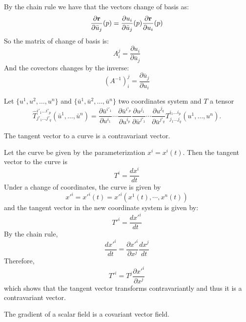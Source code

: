 By the chain rule we have that the vectors change of basis as:
\[\dfrac{\partial \mathbf{ r}}{\partial \bar{u}_j}(p)= \dfrac{\partial  u_i}{\partial  \bar{u}_j}(p)\dfrac{\partial \mathbf{ r}}{\partial  u_i}(p)\]
So the matrix of change of basis  is:
\[A_i^j=\dfrac{\partial  u_i}{\partial  \bar{u}_j}\]
And the covectors changes by the inverse:
\[\left(A^{-1}\right)_i^j=\dfrac{\partial  \bar{u}_j}{\partial  u_i}\]





\begin{theorem} 
Let $\{u^1, u^2, \dots, u^n\}$ and $\{\bar{u}^1, \bar{u}^2, \dots, \bar{u}^n\}$  two coordinates system and 
$T$ a tensor
 \[\hat{T}^{i'_1\dots i'_p}_{j'_1\dots j'_q}(\bar{u}^1,\ldots,\bar{u}^n) =
\dfrac{\partial \bar{u}^{i'_1}}{\partial u^{i_1}}
\cdots
\dfrac{\partial \bar{u}^{i'_p}}{\partial u^{i_p}}
\dfrac{\partial u^{j_{1}}}{\partial \bar{u}^{j'_{1}}}
\cdots
\dfrac{\partial u^{j_q}}{\partial \bar{u}^{j'_q}}
T^{i_1\dots i_p}_{j_{1}\dots j_q}(u^1,\ldots,u^n).\]
\end{theorem}



\begin{exa}[Contravariance] The tangent vector to a curve is a contravariant vector. 
 
\end{exa}
 
 \begin{solu}
 Let the curve be given by the parameterization $ x^i = x^i(t)$. Then the tangent vector to the curve is
\[ T^i = \frac{dx^i}{dt}\]
Under a change of coordinates, the curve is given by
\[ x'^i=x'^i (t) = x'^i(x^1(t),\cdots,x^n(t))\]
and the tangent vector in the new coordinate system  is given by:
\[ T'^i = \frac{dx'^i}{dt}\]
By the chain rule,
\[\frac{dx'^i}{dt}=\frac{\partial x'^i}{\partial x^j}\frac{dx^j}{dt}\]
Therefore,
\[ T'^i = T^j\frac{\partial x'^i}{\partial x^j}\]
which shows that the tangent vector transforms contravariantly and thus it is a contravariant vector.
 \end{solu}


\begin{example}[Covariance] The gradient of a scalar field is a covariant vector field.
\end{example}

